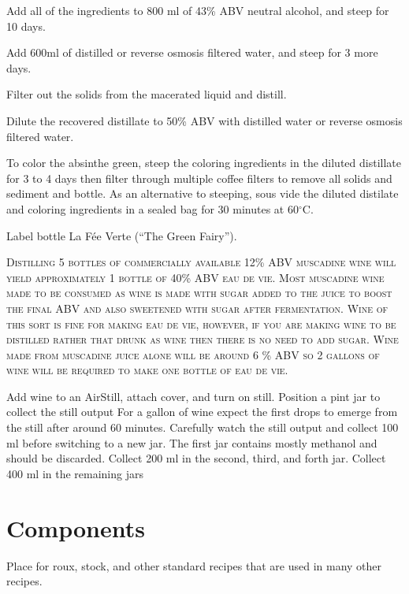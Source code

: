 \documentclass[letterpaper]{recipePMG}
\renewcommand{\deg}{$^\circ$}
\begin{document}
Add all of the ingredients to 800 ml of 43\% ABV neutral alcohol, and steep for 10 days.

Add 600ml of distilled or reverse osmosis filtered water, and steep for 3 more days.

Filter out the solids from the macerated liquid and distill.

Dilute the recovered distillate to 50\% ABV with distilled water or reverse osmosis filtered water.

To color the absinthe green, steep the coloring ingredients in the diluted distillate for 3 to 4 days then filter through multiple coffee filters to remove all solids and sediment and bottle. As an alternative to steeping, sous vide the diluted distilate and coloring ingredients in a sealed bag for 30 minutes at 60\deg C.

Label bottle La F\'{e}e Verte (``The Green Fairy'').


\newpage



\textsc{Distilling 5 bottles of commercially available 12\% ABV muscadine wine will yield approximately 1 bottle of 40\% ABV eau de vie. Most muscadine wine made to be consumed as wine is made with sugar added to the juice to boost the final ABV and also sweetened with sugar after fermentation. Wine of this sort is fine for making eau de vie, however, if you are making wine to be distilled rather that drunk as wine then there is no need to add sugar. Wine made from muscadine juice alone will be around 6 \% ABV so 2 gallons of wine will be required to make one bottle of eau de vie.} 

Add wine to an AirStill, attach cover, and turn on still. Position a pint jar to collect the still output For a gallon of wine expect the first drops to emerge from the still after around 60 minutes. Carefully watch the still output and collect 100 ml before switching to a new jar. The first jar contains mostly methanol and should be discarded. Collect 200 ml in the second, third, and forth jar. Collect 400 ml in the remaining jars

\chapter{Components}
Place for roux, stock, and other standard recipes that are used in many other recipes.
\end{document}
